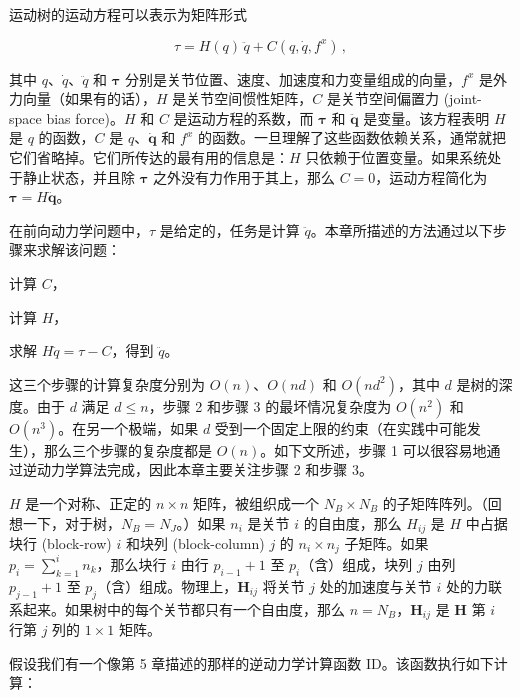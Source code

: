 \documentclass[10pt,a4paper]{book}
\theoremstyle{thmstyle} %
\theoremstyle{defstyle} %
\theoremstyle{prostyle} %
\begin{document}
运动树的运动方程可以表示为矩阵形式



$$
\tau = H ( q ) \, \ddot { q } + C ( q , \dot { q } , f ^{x} ) \, ,
$$



其中 $q$、$\dot{q}$、$\ddot{q}$ 和 $\boldsymbol{\tau}$ 分别是关节位置、速度、加速度和力变量组成的向量，$f^{x}$ 是外力向量（如果有的话），$H$ 是关节空间惯性矩阵，$C$ 是关节空间偏置力 (joint-space bias force)。$H$ 和 $C$ 是运动方程的系数，而 $\boldsymbol{\tau}$ 和 $\ddot{\boldsymbol{q}}$ 是变量。该方程表明 $H$ 是 $q$ 的函数，$C$ 是 $q$、$\dot{\boldsymbol{q}}$ 和 $f^{x}$ 的函数。一旦理解了这些函数依赖关系，通常就把它们省略掉。它们所传达的最有用的信息是：$H$ 只依赖于位置变量。如果系统处于静止状态，并且除 $\boldsymbol{\tau}$ 之外没有力作用于其上，那么 $C=0$，运动方程简化为 $\boldsymbol{\tau}=H\ddot{\boldsymbol{q}}$。



在前向动力学问题中，$\tau$ 是给定的，任务是计算 $\ddot{q}$。本章所描述的方法通过以下步骤来求解该问题：



计算 $C$，



计算 $H$，



求解 $H\ddot{q}=\tau-C$，得到 $\ddot{q}$。



这三个步骤的计算复杂度分别为 $O(n)$、$O(nd)$ 和 $O(nd^2)$，其中 $d$ 是树的深度。由于 $d$ 满足 $d \leq n$，步骤 2 和步骤 3 的最坏情况复杂度为 $O(n^2)$ 和 $O(n^3)$。在另一个极端，如果 $d$ 受到一个固定上限的约束（在实践中可能发生），那么三个步骤的复杂度都是 $O(n)$。如下文所述，步骤 1 可以很容易地通过逆动力学算法完成，因此本章主要关注步骤 2 和步骤 3。



$H$ 是一个对称、正定的 $n \times n$ 矩阵，被组织成一个 $N_B \times N_B$ 的子矩阵阵列。（回想一下，对于树，$N_B = N_J$。）如果 $n_i$ 是关节 $i$ 的自由度，那么 $H_{ij}$ 是 $H$ 中占据块行 (block-row) $i$ 和块列 (block-column) $j$ 的 $n_i \times n_j$ 子矩阵。如果 $p_i = \sum_{k=1}^{i} n_k$，那么块行 $i$ 由行 $p_{i-1}+1$ 至 $p_{i}$（含）组成，块列 $j$ 由列 $p_{j-1}+1$ 至 $p_{j}$（含）组成。物理上，$\mathbf{H}_{ij}$ 将关节 $j$ 处的加速度与关节 $i$ 处的力联系起来。如果树中的每个关节都只有一个自由度，那么 $n=N_{B}$，$\mathbf{H}_{ij}$ 是 $\mathbf{H}$ 第 $i$ 行第 $j$ 列的 $1\times1$ 矩阵。



假设我们有一个像第 5 章描述的那样的逆动力学计算函数 ID。该函数执行如下计算：
\end{document}
